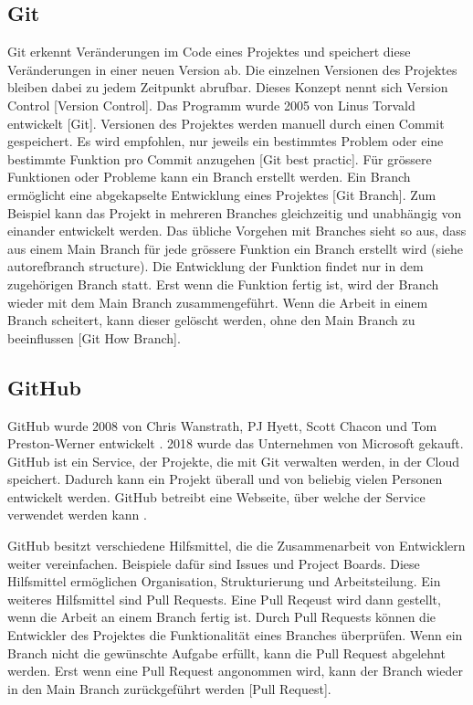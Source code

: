 \subsection{Git}\label{sub:t_git_git}
Git erkennt Veränderungen im Code eines Projektes und speichert diese
Veränderungen in einer neuen Version ab. Die einzelnen Versionen des Projektes
bleiben dabei zu jedem Zeitpunkt abrufbar. Dieses Konzept nennt sich Version
Control [Version Control]. Das Programm wurde 2005 von Linus Torvald entwickelt
[Git]. Versionen des Projektes werden manuell durch einen Commit gespeichert. Es
wird empfohlen, nur jeweils ein bestimmtes Problem oder eine bestimmte Funktion
pro Commit anzugehen [Git best practic]. Für grössere Funktionen oder Probleme
kann ein Branch erstellt werden. Ein Branch ermöglicht eine abgekapselte
Entwicklung eines Projektes [Git Branch]. Zum Beispiel kann das Projekt in
mehreren Branches gleichzeitig und unabhängig von einander entwickelt werden.
Das übliche Vorgehen mit Branches sieht so aus, dass aus einem Main Branch für
jede grössere Funktion ein Branch erstellt wird (siehe autoref{branch
structure}). Die Entwicklung der Funktion findet nur in dem zugehörigen Branch
statt. Erst wenn die Funktion fertig ist, wird der Branch wieder mit dem Main
Branch zusammengeführt. Wenn die Arbeit in einem Branch scheitert, kann dieser
gelöscht werden, ohne den Main Branch zu beeinflussen [Git How Branch].


\subsection{GitHub}\label{sub:t_git_gh}
GitHub wurde 2008 von Chris Wanstrath, PJ Hyett, Scott Chacon und Tom
Preston-Werner entwickelt \cite{noauthor_github_2021}. 2018 wurde das
Unternehmen von Microsoft gekauft. GitHub ist ein Service, der Projekte, die mit
Git verwalten werden, in der Cloud speichert. Dadurch kann ein Projekt überall
und von beliebig vielen Personen entwickelt werden. GitHub betreibt eine
Webseite, über welche der Service verwendet werden kann
\cite{noauthor_github_2021}.

GitHub besitzt verschiedene Hilfsmittel, die die Zusammenarbeit von Entwicklern
weiter vereinfachen. Beispiele dafür sind Issues und Project Boards. Diese
Hilfsmittel ermöglichen Organisation, Strukturierung und Arbeitsteilung. Ein
weiteres Hilfsmittel sind Pull Requests. Eine Pull Reqeust wird dann gestellt,
wenn die Arbeit an einem Branch fertig ist. Durch Pull Requests können die
Entwickler des Projektes die Funktionalität eines Branches überprüfen. Wenn ein
Branch nicht die gewünschte Aufgabe erfüllt, kann die Pull Request abgelehnt
werden. Erst wenn eine Pull Request angonommen wird, kann der Branch wieder in
den Main Branch zurückgeführt werden [Pull Request].

